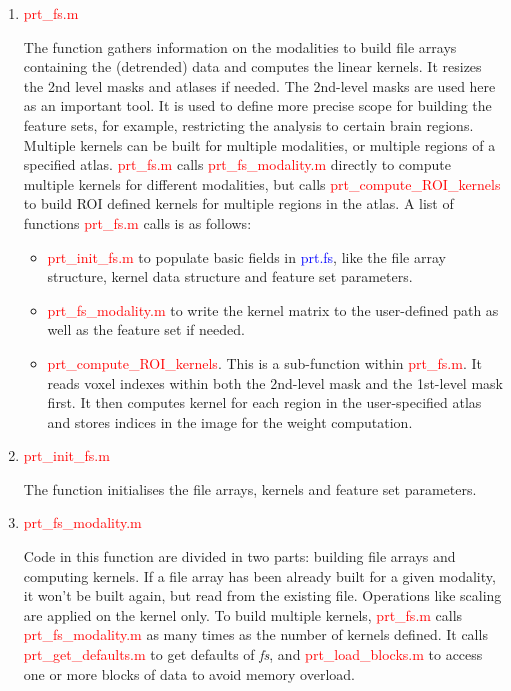 \begin{enumerate}

\item \textcolor{red}{prt\_fs.m}

The function gathers information on the modalities to build file arrays containing the (detrended) data and computes the linear kernels. It resizes the 2nd level masks and atlases if needed. The 2nd-level masks are used here as an important tool. It is used to define more precise scope for building the feature sets, for example, restricting the analysis to certain brain regions. Multiple kernels can be built for multiple modalities, or multiple regions of a specified atlas. \textcolor{red}{prt\_fs.m} calls  \textcolor{red}{prt\_fs\_modality.m} directly to compute multiple kernels for different modalities, but calls \textcolor{red}{prt\_compute\_ROI\_kernels} to build ROI defined kernels for multiple regions in the atlas.  A list of functions \textcolor{red}{prt\_fs.m} calls is as follows:

\begin{itemize}
\item \textcolor{red}{prt\_init\_fs.m} to populate basic fields in \textcolor{blue}{prt.fs}, like the file array structure, kernel data structure and feature set parameters. 
\item \textcolor{red}{prt\_fs\_modality.m} to write the kernel matrix to the user-defined path as well as the feature set if needed.
\item \textcolor{red}{prt\_compute\_ROI\_kernels}. This is a sub-function within \textcolor{red}{prt\_fs.m}. It reads voxel indexes within both the 2nd-level mask and the 1st-level mask first. It then computes kernel for each region in the user-specified atlas and stores indices in the image for the weight computation.   
\end{itemize}

\item \textcolor{red}{prt\_init\_fs.m}

The function initialises the file arrays, kernels and feature set parameters.
     
\item \textcolor{red}{prt\_fs\_modality.m}

Code in this function are divided in two parts: building file arrays and computing kernels. If a file array has been already built for a given modality, it won’t be built again, but read from the existing file. Operations like scaling are applied on the kernel only. To build multiple kernels, \textcolor{red}{prt\_fs.m} calls \textcolor{red}{prt\_fs\_modality.m} as many times as the number of kernels defined. It calls \textcolor{red}{prt\_get\_defaults.m} to get defaults of \textit{fs}, and \textcolor{red}{prt\_load\_blocks.m} to access one or more blocks of data to avoid memory overload. 

\end{enumerate}


